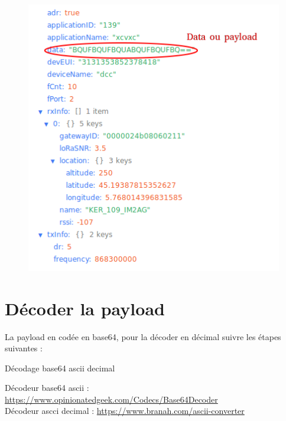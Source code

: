\documentclass{article}
\begin{document}
\begin{figure}[H]
\begin{center}
\advance\leftskip-3cm
\advance\rightskip-3cm
\includegraphics[keepaspectratio=true,scale=0.4]{payload.png}
\label{visina8}
\end{center}\end{figure}



\section{Décoder la payload}

La payload en codée en base64, pour la décoder en décimal suivre les étapes suivantes :

Décodage base64 \textrightarrow  ascii \textrightarrow  decimal

Décodeur base64 \textrightarrow ascii : \url{https://www.opinionatedgeek.com/Codecs/Base64Decoder}\\
Décodeur ascci \textrightarrow decimal : \url{https://www.branah.com/ascii-converter}

\end{document}
